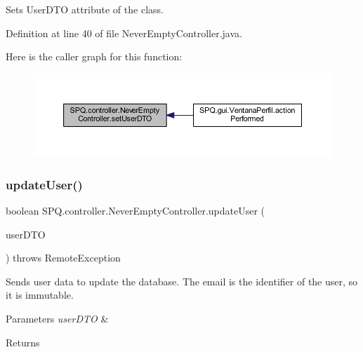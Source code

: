 Sets User\+D\+TO attribute of the class. 

Definition at line 40 of file Never\+Empty\+Controller.\+java.

Here is the caller graph for this function\+:
\nopagebreak
\begin{figure}[H]
\begin{center}
\leavevmode
\includegraphics[width=350pt]{class_s_p_q_1_1controller_1_1_never_empty_controller_a847c0288b7c18327d81c092f8c234d01_icgraph}
\end{center}
\end{figure}
\mbox{\label{class_s_p_q_1_1controller_1_1_never_empty_controller_abac74fe36817d476abdd20d19df2092b}} 
\subsubsection{\texorpdfstring{update\+User()}{updateUser()}}
{\footnotesize\ttfamily boolean S\+P\+Q.\+controller.\+Never\+Empty\+Controller.\+update\+User (\begin{DoxyParamCaption}\item[{\mbox{\hyperlink{class_s_p_q_1_1dto_1_1_user_d_t_o}{User\+D\+TO}}}]{user\+D\+TO }\end{DoxyParamCaption}) throws Remote\+Exception}

Sends user data to update the database. The email is the identifier of the user, so it is immutable. 
\begin{DoxyParams}{Parameters}
{\em user\+D\+TO} & \\
\hline
\end{DoxyParams}
\begin{DoxyReturn}{Returns}

\end{DoxyReturn}


